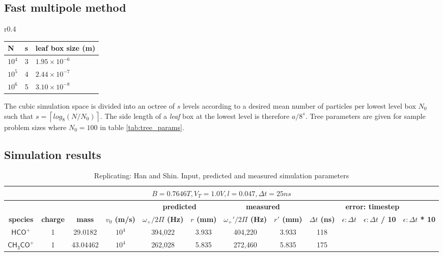 \documentclass[10pt,conference,onecolumn]{IEEEtran}
\begin{document}
\subsection{Fast multipole method}
\label{sec:fmm}

\begin{wraptable}{r}{0.4\columnwidth}
\label{tab:tree_params}
\begin{tabular}{l|l|l}
\hline \hline
\textbf{N} & \textbf{s} & \textbf{leaf box size} (m) \\
\hline
$10^4$ & 3 & $1.95 \times 10^{-6}$ \\
$10^5$ & 4 & $2.44 \times 10^{-7}$ \\
$10^6$ & 5 & $3.10 \times 10^{-8}$ \\
\hline \hline
\end{tabular}
 \caption{Octree parameters, $N_0 = 100$}
\end{wraptable}

The cubic simulation space is divided into an octree of $s$ levels according to a desired mean number of particles per lowest level box $N_0$ such that $s = \left\lceil log_8(N / N_0) \right\rceil$.
The side length of a \emph{leaf} box at the lowest level is therefore $a / 8^s$.
Tree parameters are given for sample problem sizes where $N_0 = 100$ in table \ref{tab:tree_params}.



\subsection{Simulation results}

\begin{table}[htbp]
 \centering	  	  
 \caption{Replicating: Han and Shin\cite{Han1997}. Input, predicted and measured simulation parameters}
\label{tab:han}
\begin{tabular}{c|c|c|c|c|c|c|c|c|c|c|c}
 \hline \hline
  \multicolumn{12}{|c|}{$B = 0.7646 T, V_T = 1.0 V, l = 0.047, \Delta t = 25ns$} \\
 \hline \hline
 \multicolumn{4}{|c|}{ } & \multicolumn{2}{|c|}{\textbf{predicted}} & \multicolumn{2}{|c|}{\textbf{measured}} & \multicolumn{4}{|c|}{\textbf{error: timestep}} \\ 
 \hline
 \textbf{species} & \textbf{charge} & \textbf{mass} & \textbf{$v_0$ (m/s)} & \textbf{$\omega_+ / 2\Pi$ (Hz)} & \textbf{$r$ (mm)} & \textbf{$\omega_+' / 2\Pi$ (Hz)}  & \textbf{$r'$ (mm)} & \textbf{$\Delta t$ (ns)} & \textbf{$\epsilon: \Delta t$}& \textbf{$\epsilon: \Delta t$ / 10} & \textbf{$\epsilon: \Delta t$ * 10}\\ 
 \hline
 $\mathsf{HCO^+}$ & 1 & 29.0182 & $10^4$ & 394,022 & 3.933 & 404,220 & 3.933 & 118 & \\
 $\mathsf{CH_3CO^+}$ & 1 & 43.04462 & $10^4$ & 262,028 & 5.835 & 272,460 & 5.835 & 175 & \\
 \hline \hline
\end{tabular}
\end{table}
\end{document}
